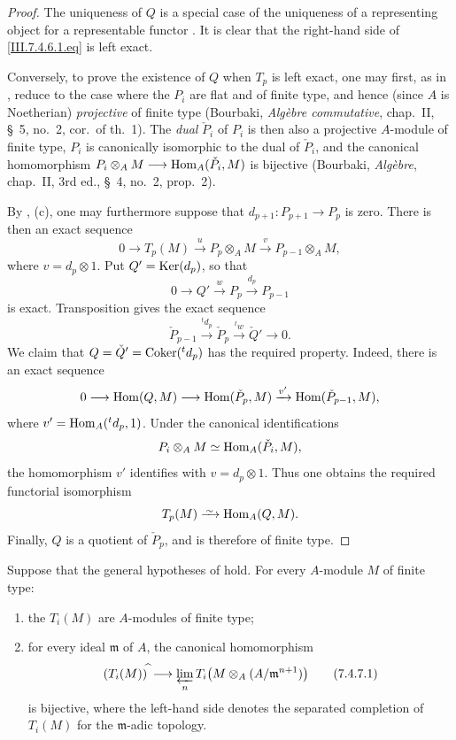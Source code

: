 \begin{proof}
The uniqueness of $Q$ is a special case of the uniqueness of a
representing object for a representable functor
.  It is clear that the right-hand side of
\eqref{III.7.4.6.1.eq} is left exact.

Conversely, to prove the existence of $Q$ when $T_p$ is left
exact, one may first, as in , reduce to the
case where the $P_i$ are flat and of finite type, and hence
(since $A$ is Noetherian) \emph{projective} of finite type (Bourbaki,
\emph{Alg\`ebre commutative}, chap.~II, \S~5, no.~2, cor.\ of
th.~1).  The \emph{dual} $\check{P}_i$ of $P_i$ is then also a
projective $A$-module of finite type, $P_i$ is canonically
isomorphic to the dual of $\check{P}_i$, and the canonical
homomorphism $P_i\otimes_A M
\longrightarrow
\operatorname{Hom}_A(\check{P}_i,M)$
is bijective (Bourbaki, \emph{Alg\`ebre}, chap.~II,
3rd ed., \S~4, no.~2, prop.~2).

By , (c), one may furthermore suppose that
$d_{p+1}:P_{p+1}\to P_p$ is zero.  There is then an exact
sequence
\[
  0
  \longrightarrow T_p(M)
  \xrightarrow{u}
  P_p\otimes_A M
  \xrightarrow{v}
  P_{p-1}\otimes_A M,
\]
where $v=d_p\otimes 1$.  Put $Q'=\operatorname{Ker}(d_p)$, so that
\[
  0
  \longrightarrow Q'
  \xrightarrow{w} P_p
  \xrightarrow{d_p}
  P_{p-1}
\]
is exact.  Transposition gives the exact sequence
\[
  \check{P}_{p-1}
  \xrightarrow{{}^t d_p}
  \check{P}_p
  \xrightarrow{{}^t w}
  \check{Q}'
  \longrightarrow 0.
\]
We claim that $Q=\check{Q}'=\operatorname{Coker}({}^t d_p)$
has the required property.  Indeed, there is an exact sequence
\[
  0
  \longrightarrow \operatorname{Hom}(Q,M)
  \longrightarrow \operatorname{Hom}(\check{P}_p,M)
  \xrightarrow{v'}
  \operatorname{Hom}(\check{P}_{p-1},M),
\]
where $v'=\operatorname{Hom}_A({}^t d_p,1)$.  Under the canonical
identifications
\[
  P_i\otimes_A M\simeq\operatorname{Hom}_A(\check{P}_i,M),
\]
the homomorphism $v'$ identifies with $v=d_p\otimes 1$.
Thus one obtains the required functorial isomorphism
\[
  T_p(M)\isoto\Hom_A(Q,M).
\]
Finally, $Q$ is a quotient of $\check{P}_p$, and is therefore
of finite type.
\end{proof}

\begin{proposition}[7.4.7]
\label{III.7.4.7}
Suppose that the general hypotheses of  hold.
For every $A$-module $M$ of finite type:
\begin{enumerate}
  \item[\textup{(i)}] the $T_i(M)$ are $A$-modules of finite type;
  \item[\textup{(ii)}] for every ideal $\mathfrak m$ of $A$, the
    canonical homomorphism
    \[
      (T_i(M))^{\widehat{\,}}
      \longrightarrow
      \varprojlim_n
      T_i\bigl(M\otimes_A(A/\mathfrak m^{n+1})\bigr)
      \tag{7.4.7.1}\label{III.7.4.7.1.eq}
    \]
    is bijective, where the left-hand side denotes the
    separated completion of $T_i(M)$ for the
    $\mathfrak m$-adic topology.
\end{enumerate}
\end{proposition}

